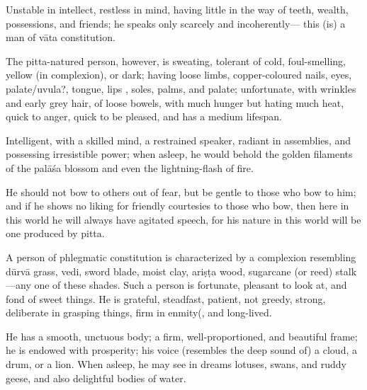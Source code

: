 \begin{translation}
\begin{tt}
Unstable in intellect, restless in mind, having little in the way of teeth, wealth, possessions, and friends; he speaks only scarcely and incoherently— this (is) a man of vāta constitution.

\item[67]

\item[68]

The pitta-natured person, however, is sweating, tolerant of cold, foul-smelling, yellow (in complexion), or dark; having loose limbs, copper-coloured  nails, eyes, palate/uvula?, tongue, lips , soles, palms, and palate; unfortunate, with wrinkles and early grey hair, of loose bowels, with much hunger but hating much heat, quick to anger, quick to be pleased, and has a medium lifespan.


\item[69]

Intelligent, with a skilled mind, a restrained speaker, radiant in assemblies, and possessing irresistible power; when asleep, he would behold the golden filaments of the palāśa blossom  and even the lightning-flash of fire.

\item[70]

He should not bow to others out of fear, but be gentle  to those who bow to him; and if he shows no liking  for friendly courtesies to those who bow, then here in this world he will always  have agitated speech, for his nature in this world will be one produced by pitta. 

\item[71]

A person of phlegmatic constitution is characterized by a complexion resembling dūrvā grass, vedi, sword blade, moist clay, ariṣṭa wood, sugarcane (or reed) stalk —any one of these  shades. Such a person is  fortunate, pleasant to look at, and fond of sweet things. He is grateful, steadfast, patient, not greedy, strong, deliberate in grasping things, firm in enmity(, and long-lived.

\item[73]

He has a smooth, unctuous body; a firm, well-proportioned, and beautiful frame; he is endowed with prosperity; his voice (resembles the deep sound of) a cloud, a drum, or a lion. When asleep, he may see in dreams lotuses, swans, and ruddy geese, and also delightful bodies of water.

\item[74]


\end{tt}
\end{translation}

